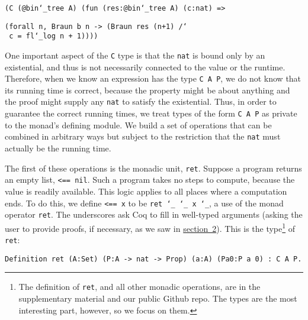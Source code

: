 \documentclass{llncs}
\newcommand{\ChapRef}[2]{\SecRef{#1}{#2}}
\newcommand{\SecRef}[2]{section~#1}
\newcommand{\ChapRefLocal}[3]{\hyperref[#1]{\ChapRef{#2}{#3}}}
\newcommand{\Scribtexttt}[1]{{\texttt{#1}}}
\newcommand{\Stttextmore}{{\fontencoding{T1}\selectfont>}}
\newcommand{\Stttextless}{{\fontencoding{T1}\selectfont<}}
\newenvironment{SingleColumn}{\begin{list}{}{\topsep=0pt\partopsep=0pt%
\listparindent=0pt\itemindent=0pt\labelwidth=0pt\leftmargin=0pt\rightmargin=0pt%
\itemsep=0pt\parsep=0pt}\item}{\end{list}}
\newenvironment{InlineCode}{\begin{trivlist}\item\footnotesize}{\end{trivlist}}
\newcommand{\NoteBox}[1]{\footnote{#1}}
\newcommand{\NoteContent}[1]{#1}
\begin{document}
\noindent \begin{InlineCode}\begin{SingleColumn}\Scribtexttt{(C (@bin{\char`\_}tree A) (fun (res{\hbox{\texttt{:}}}@bin{\char`\_}tree A) (c{\hbox{\texttt{:}}}nat) ={\Stttextmore}}

\Scribtexttt{}\mbox{\hphantom{\Scribtexttt{xxx}}}\Scribtexttt{(forall n, Braun b n {-}{\Stttextmore} (Braun res (n+1) /{\char`\\} c = fl{\char`\_}log n + 1))))}\end{SingleColumn}\end{InlineCode}

One important aspect of the \Scribtexttt{C} type is that the \Scribtexttt{nat} is bound
only by an existential, and thus is not necessarily connected to the
value or the runtime. Therefore, when we know an expression has the
type \Scribtexttt{C A P}, we do not know that its running time is correct,
because the property might be about anything and the proof might
supply any \Scribtexttt{nat} to satisfy the existential.  Thus, in order to
guarantee the correct running times, we treat types of the form \Scribtexttt{C
A P} as private to the monad{'}s defining module. We build a set of
operations that can be combined in arbitrary ways but subject to the
restriction that the \Scribtexttt{nat} must actually be the running time.

The first of these operations is the monadic unit, \Scribtexttt{ret}. Suppose a
program returns an empty list, \Scribtexttt{{\Stttextless}== nil}. Such a program takes no
steps to compute, because the value is readily available. This logic
applies to all places where a computation ends. To do this, we define
\Scribtexttt{{\Stttextless}== x} to be \Scribtexttt{ret {\char`\_} {\char`\_} x {\char`\_}}, a use of the monad operator
\Scribtexttt{ret}. The underscores ask Coq to fill in well{-}typed
arguments (asking the user to provide proofs, if necessary, as we saw
in \ChapRefLocal{t:x28part_x22secx3ainsertx22x29}{2}{Overview of Our Library}).
This is the type\NoteBox{\NoteContent{The definition of \Scribtexttt{ret}, and all other
monadic operations, are in the supplementary material and our public
Github repo. The types are the most interesting part, however,
so we focus on them.}} of \Scribtexttt{ret}:


\noindent \begin{InlineCode}\begin{SingleColumn}\Scribtexttt{Definition ret (A{\hbox{\texttt{:}}}Set) (P{\hbox{\texttt{:}}}A {-}{\Stttextmore} nat {-}{\Stttextmore} Prop) (a{\hbox{\texttt{:}}}A) (Pa0{\hbox{\texttt{:}}}P a 0) {\hbox{\texttt{:}}} C A P{\hbox{\texttt{.}}}}\end{SingleColumn}\end{InlineCode}
\end{document}
